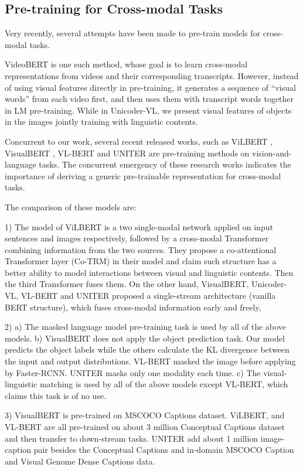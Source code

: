 \documentclass[letterpaper]{article} \usepackage{aaai20}  \usepackage{times}  \usepackage{helvet} \usepackage{courier}  \usepackage[hyphens]{url}  \usepackage{graphicx} \urlstyle{rm} \def\UrlFont{\rm}  \usepackage{graphicx}  \frenchspacing  \setlength{\pdfpagewidth}{8.5in}  \setlength{\pdfpageheight}{11in}  \usepackage{amssymb}
\begin{document}
\subsection{Pre-training for Cross-modal Tasks}
Very recently, several attempts have been made to pre-train models for cross-modal tasks. 

VideoBERT \cite{sun2019videobert} is one such method, whose goal is to learn cross-modal representations from videos and their corresponding transcripts. However, instead of using visual features directly in pre-training, it generates a sequence of “visual words” from each video first, and then uses them with transcript words together in LM pre-training. While in Unicoder-VL, we present visual features of objects in the images jointly training with linguistic contents.

Concurrent to our work, several recent released works, such as ViLBERT \cite{lu2019vilbert}, VisualBERT \cite{li2019visualbert}, VL-BERT \cite{su2019vl} and UNITER \cite{chen2019uniter} are pre-training methods on vision-and-language tasks. The concurrent emergency of these research works indicates the importance of deriving a generic pre-trainable representation for cross-modal tasks.

The comparison of these models are: 

1) The model of ViLBERT is a two single-modal network applied on input sentences and images respectively, followed by a cross-modal Transformer combining information from the two sources. They propose a co-attentional Transformer layer (Co-TRM) in their model and claim such structure has a better ability to model interactions between visual and linguistic contents. Then the third Transformer fuses them. On the other hand, VisualBERT, Unicoder-VL, VL-BERT and UNITER proposed a single-stream architecture (vanilla BERT structure), which fuses cross-modal information early and freely,

2) a) The masked language model pre-training task is used by all of the above models. b) VisualBERT does not apply the object prediction task. Our model predicts the object labels while the others calculate the KL divergence between the input and output distributions. VL-BERT masked the image before applying by Faster-RCNN. UNITER masks only one modality each time. c) The visual-linguistic matching is used by all of the above models except VL-BERT, which claims this task is of no use.

3) VisualBERT is pre-trained on MSCOCO Captions dataset. ViLBERT, and VL-BERT are all pre-trained on about 3 million Conceptual Captions \cite{sharma2018conceptual} dataset and then transfer to down-stream tasks. UNITER add about 1 million image-caption pair besides the Conceptual Captions and in-domain  MSCOCO Caption and Visual Genome Dense Captions \cite{krishna2017visual} data.
\end{document}
